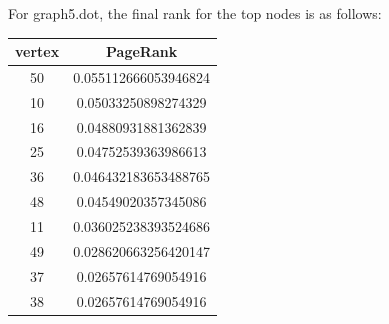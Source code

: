 \documentclass[9pt,twoside]{exam}
\begin{document}
For graph5.dot, the final rank for the top nodes is as follows:\\
\begin{center}
\begin{tabular}{ |c|c| } 
 \hline
 vertex & PageRank  \\ 
\hline
50 & 0.055112666053946824\\ 
10 & 0.05033250898274329\\ 
16 & 0.04880931881362839\\ 
25 & 0.04752539363986613\\ 
36 & 0.046432183653488765\\ 
48 & 0.04549020357345086\\ 
11 & 0.036025238393524686\\ 
49 & 0.028620663256420147\\ 
37 & 0.02657614769054916\\ 
38 & 0.02657614769054916\\ 
 \hline
\end{tabular}
\end{center} 
\end{document}

